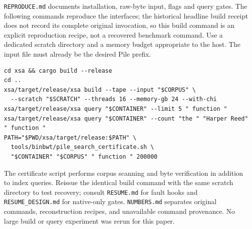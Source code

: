 \documentclass[10pt]{article}
\begin{document}
\texttt{REPRODUCE.md} documents installation, raw-byte input, flags and query gates. The following
commands reproduce the interfaces; the historical headline build receipt does not record its
complete original invocation, so this build command is an explicit reproduction recipe, not a
recovered benchmark command. Use a dedicated scratch directory and a memory budget appropriate to
the host. The input file must already be the desired Pile prefix.
\begin{verbatim}
cd xsa && cargo build --release
cd ..
xsa/target/release/xsa build --tape --input "$CORPUS" \
  --scratch "$SCRATCH" --threads 16 --memory-gb 24 --with-chi
xsa/target/release/xsa query "$CONTAINER" --limit 5 " function "
xsa/target/release/xsa query "$CONTAINER" --count "the " "Harper Reed" " function "
PATH="$PWD/xsa/target/release:$PATH" \
  tools/binbwt/pile_search_certificate.sh \
  "$CONTAINER" "$CORPUS" " function " 200000
\end{verbatim}
The certificate script performs corpus scanning and byte verification in addition to index queries.
Reissue the identical build command with the same scratch directory to test recovery; consult
\texttt{RESUME.md} for fault hooks and \texttt{RESUME\_DESIGN.md} for native-only gates.
\texttt{NUMBERS.md} separates original commands, reconstruction recipes, and unavailable command
provenance. No large build or query experiment was rerun for this paper.
\end{document}
